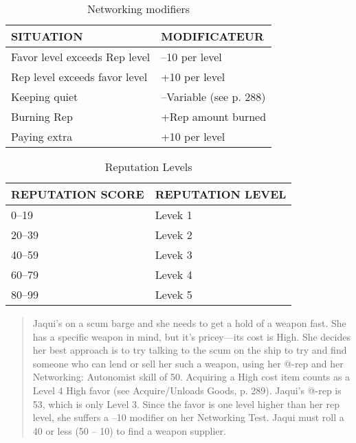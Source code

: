 \begin{table} \caption{Networking modifiers} \begin{tabular}{|l|l|} \hline

SITUATION &MODIFICATEUR\\ \hline

Favor level exceeds Rep level &–10 per level \\ \hline

Rep level exceeds favor level &+10 per level \\ \hline

Keeping quiet &–Variable (see p. 288) \\ \hline

Burning Rep &+Rep amount burned \\ \hline

Paying extra &+10 per level \\ \hline

\end{tabular} \end{table} 

\begin{table} \caption{Reputation Levels} \begin{tabular}{|l|l|} \hline

REPUTATION SCORE &REPUTATION LEVEL \\ \hline

0–19 &Levek 1 \\ \hline

20–39 &Levek 2 \\ \hline

40–59 &Levek 3 \\ \hline

60–79 &Levek 4 \\ \hline

80–99 &Levek 5 \\ \hline

\end{tabular} \end{table} 

\begin{quotation} Jaqui’s on a scum barge and she needs to get a hold of a weapon fast. She has a specific weapon in mind, but it’s pricey—its cost is High. She decides her best approach is to try talking to the scum on the ship to try and find someone who can lend or sell her such a weapon, using her @-rep and her Networking: Autonomist skill of 50. Acquiring a High cost item counts as a Level 4 High favor (see Acquire/Unloads Goods, p. 289). Jaqui’s @-rep is 53, which is only Level 3. Since the favor is one level higher than her rep level, she suffers a –10 modifier on her Networking Test. Jaqui must roll a 40 or less (50 – 10) to find a weapon supplier. \end{quotation} 





